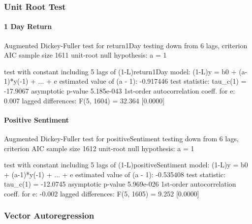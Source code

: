 \subsubsection{Unit Root Test}

\paragraph{1 Day Return}

Augmented Dickey-Fuller test for return1Day
testing down from 6 lags, criterion AIC
sample size 1611
unit-root null hypothesis: a = 1

test with constant 
including 5 lags of (1-L)return1Day
model: (1-L)y = b0 + (a-1)*y(-1) + ... + e
estimated value of (a - 1): -0.917446
test statistic: tau\_c(1) = -17.9067
asymptotic p-value 5.185e-043
1st-order autocorrelation coeff. for e: 0.007
lagged differences: F(5, 1604) = 32.364 [0.0000]

\paragraph{Positive Sentiment}

Augmented Dickey-Fuller test for positiveSentiment
testing down from 6 lags, criterion AIC
sample size 1612
unit-root null hypothesis: a = 1

test with constant 
including 5 lags of (1-L)positiveSentiment
model: (1-L)y = b0 + (a-1)*y(-1) + ... + e
estimated value of (a - 1): -0.535408
test statistic: tau\_c(1) = -12.0745
asymptotic p-value 5.969e-026
1st-order autocorrelation coeff. for e: -0.002
lagged differences: F(5, 1605) = 9.252 [0.0000]

\subsubsection{Vector Autoregression}

